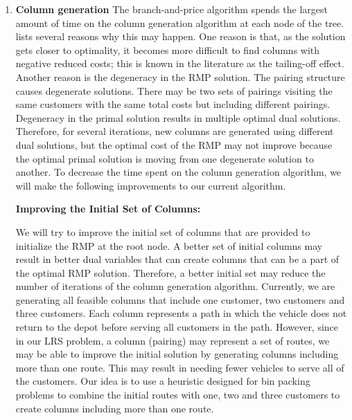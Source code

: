 \begin{enumerate}
\item {\bf Column generation} The branch-and-price algorithm spends the largest amount
  of time on the column generation algorithm at each node of the tree. \citet{Vanderbeck2}
  lists several reasons why this may happen.
  One reason is that, as the solution gets closer to 
  optimality, it becomes more difficult to find columns with negative reduced costs; 
  this is known in the literature as the tailing-off effect. Another reason is the 
  degeneracy in the RMP solution. The pairing structure causes degenerate solutions.
  There may be two sets of pairings visiting the same customers with the same total costs  
  but including different pairings. Degeneracy in the primal solution results in 
  multiple optimal dual solutions. Therefore, for several iterations,  new 
  columns are generated using different dual solutions, but the optimal cost of the 
  RMP may not improve because the optimal primal solution is moving from one degenerate 
  solution to another. To decrease the time spent on the column generation algorithm, 
  we will make the following improvements to our current algorithm.

  {\bf Improving the Initial Set of Columns:}

  We will try to improve the initial set of columns that are provided to 
  initialize the RMP at the root node. A better set of initial columns may result 
  in better dual variables that can create columns that can be a part of the optimal
  RMP solution. Therefore, a better initial set may reduce the number of iterations 
  of the column generation algorithm. Currently, we are 
  generating all feasible columns that include one customer, two customers and 
  three customers. Each column represents a path in which the vehicle does not 
  return to the depot before serving all customers in the path. However, since 
  in our LRS problem, a column (pairing) may represent a set of routes, we may 
  be able to improve the initial solution by generating columns including more 
  than one route. This may result in needing fewer vehicles to serve all of the 
  customers. Our idea is to use a heuristic designed for bin packing problems 
  to combine the initial routes with one, two and three customers to create 
  columns including more than one route.  
  


\end{enumerate}
